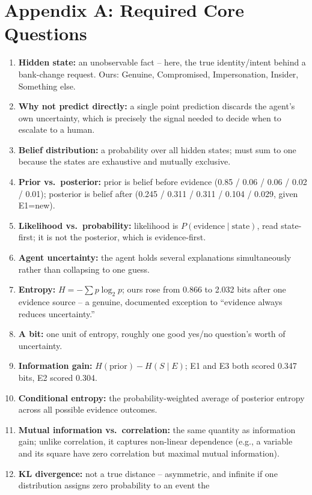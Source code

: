 \documentclass[10pt]{article}
\begin{document}
\section*{Appendix A: Required Core Questions}
{\small
\begin{enumerate}
\item \textbf{Hidden state:} an unobservable fact -- here, the true
identity/intent behind a bank-change request. Ours: Genuine,
Compromised, Impersonation, Insider, Something else.
\item \textbf{Why not predict directly:} a single point prediction
discards the agent's own uncertainty, which is precisely the signal
needed to decide when to escalate to a human.
\item \textbf{Belief distribution:} a probability over all hidden
states; must sum to one because the states are exhaustive and mutually
exclusive.
\item \textbf{Prior vs.\ posterior:} prior is belief before evidence
(0.85 / 0.06 / 0.06 / 0.02 / 0.01); posterior is belief after
(0.245 / 0.311 / 0.311 / 0.104 / 0.029, given E1=new).
\item \textbf{Likelihood vs.\ probability:} likelihood is
$P(\text{evidence}\mid\text{state})$, read state-first; it is not the
posterior, which is evidence-first.
\item \textbf{Agent uncertainty:} the agent holds several explanations
simultaneously rather than collapsing to one guess.
\item \textbf{Entropy:} $H=-\sum p\log_2 p$; ours rose from 0.866 to
2.032 bits after one evidence source -- a genuine, documented
exception to ``evidence always reduces uncertainty.''
\item \textbf{A bit:} one unit of entropy, roughly one good yes/no
question's worth of uncertainty.
\item \textbf{Information gain:} $H(\text{prior})-H(S\mid E)$; E1 and
E3 both scored 0.347 bits, E2 scored 0.304.
\item \textbf{Conditional entropy:} the probability-weighted average
of posterior entropy across all possible evidence outcomes.
\item \textbf{Mutual information vs.\ correlation:} the same quantity
as information gain; unlike correlation, it captures non-linear
dependence (e.g., a variable and its square have zero correlation but
maximal mutual information).
\item \textbf{KL divergence:} not a true distance -- asymmetric, and
infinite if one distribution assigns zero probability to an event the

\end{enumerate}}
\end{document}
